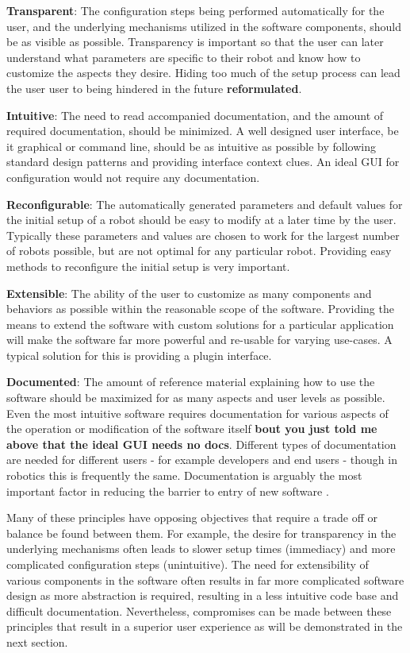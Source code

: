 \documentclass[10pt,journal,compsoc]{joser1}
\begin{document}
{{\bf Transparent}: The configuration steps being performed automatically for the user, and the underlying mechanisms utilized in the software components, should be as visible as possible. Transparency is important so that the user can later understand what parameters are specific to their robot and know how to customize the aspects they desire. Hiding too much of the setup process can lead the user user to being hindered in the future \textbf{reformulated}.

{\bf Intuitive}: The need to read accompanied documentation, and the amount of required documentation, should be minimized. A well designed user interface, be it graphical or command line, should be as intuitive as possible by following standard design patterns and providing interface context clues. An ideal GUI for configuration would not require any documentation.

{\bf Reconfigurable}: The automatically generated parameters and default values for the initial setup of a robot should be easy to modify at a later time by the user. Typically these parameters and values are chosen to work for the largest number of robots possible, but are not optimal for any particular robot. Providing easy methods to reconfigure the initial setup is very important. 

{\bf Extensible}: The ability of the user to customize as many components and behaviors as possible within the reasonable scope of the software. Providing the means to extend the software with custom solutions for a particular application will make the software far more powerful and re-usable for varying use-cases. A typical solution for this is providing a plugin interface.

{\bf Documented}: The amount of reference material explaining how to use the software should be maximized for as many aspects and user levels as possible. Even the most intuitive software requires documentation for various aspects of the operation or modification of the software itself \textbf{bout you just told me above that the ideal GUI needs no docs}. Different types of documentation are needed for different users - for example developers and end users - though in robotics this is frequently the same. Documentation is arguably the most important factor in reducing the barrier to entry of new software \cite{forward2002relevance}.

Many of these principles have opposing objectives that require a trade off or balance be found between them. For example, the desire for transparency in the underlying mechanisms often leads to slower setup times (immediacy) and more complicated configuration steps (unintuitive). The need for extensibility of various components in the software often results in far more complicated software design as more abstraction is required, resulting in a less intuitive code base and difficult documentation. Nevertheless, compromises can be made between these principles that result in a superior user experience as will be demonstrated in the next section.

}
\end{document}
